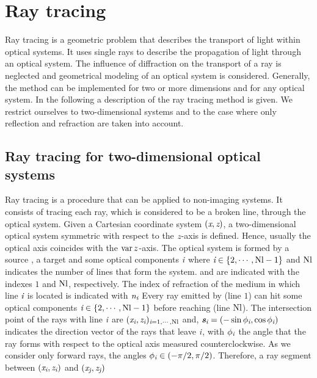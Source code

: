 \chapter{Ray tracing}\label{chap:raytracing}
Ray tracing is a geometric problem that describes the transport of light within optical systems.
It uses single rays to describe the propagation of light through an optical system.
The influence of diffraction on the transport of a ray is neglected and geometrical modeling of an optical system is considered.
Generally, the method can be implemented for two or more dimensions and for any optical system.
In the following a description of the ray tracing method is given. We restrict ourselves to two-dimensional systems and to the case where only reflection and refraction are taken into account.
\section{Ray tracing for two-dimensional optical systems}\label{sec:raytracing}
Ray tracing is a procedure that can be applied to non-imaging systems. It consists of tracing each ray, which is considered to be a broken line, through the optical system.
Given a Cartesian coordinate system $(\textit{x}, \textit{z})$, a two-dimensional optical system symmetric with respect to the $\textit{z}$-axis is defined. 
Hence, usually the optical axis coincides with the $\operatorname{var}{z}$-axis. 
The optical system is formed by a source , a target   and some optical components $\textit{i}$ where $\textit{i} \in \{2, \cdots, \textrm{Nl}-1\}$ and $\textrm{Nl}$
 indicates the number of lines that form the system.  and  are indicated with the indexes $1$ and $\textrm{Nl}$, respectively. 
The index of refraction of the medium in which line $\textit{i}$ is located is indicated with $\textit{n}_{\textit{i}}$
Every ray emitted by  (line $1$) can hit some optical components $\textit{i}\in\{2, \cdots, \textrm{Nl} -1\}$ before reaching  (line $\textrm{Nl}$). 
The intersection point of the rays with line $\textit{i}$ are $(\textit{x}_{\textit{i}}, \textit{z}_{\textit{i}})_{\textit{i} =1, \cdots, \textrm{Nl}}$ and, $\textit{\textbf{s}}_{\textit{i}}= (-\sin \phi_{\textit{i}}, \cos \phi_{\textit{i}})$ indicates the direction vector of the rays that leave $\textit{i}$,
with $\phi_{\textit{i}}$ the angle that the ray forms with respect to the optical axis measured counterclockwise. As we consider only forward rays, the angles 
$\phi_{\textit{i}}\in (-\pi/2, \pi/2)$.
Therefore, a ray segment between $(\textit{x}_{\textit{i}}, \textit{z}_{\textit{i}})$ and $(\textit{x}_{\textit{j}}, \textit{z}_{\textit{j}})$ 

